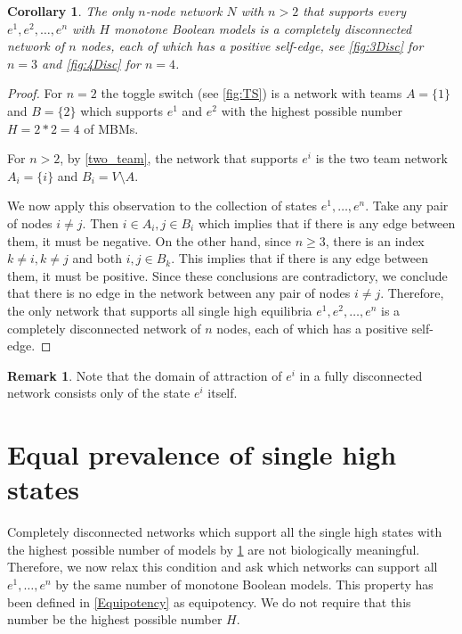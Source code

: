\documentclass[12pt]{amsart}
\newtheorem{cor}[thm]{Corollary}
\theoremstyle{definition}
\newtheorem{rem}[thm]{Remark}
\begin{document}
\begin{cor} \label{cor:disconnected}
    The only $n$-node network $N$ with $n >2$ that supports every $e^1, e^2, \ldots, e^n$ with $H$ monotone Boolean models is a completely disconnected network of $n$ nodes, each of which has a positive self-edge, see \cref{fig:3Disc} for $n=3$ and \cref{fig:4Disc} for $n=4$.
\end{cor}
\begin{proof}
For $n=2$ the toggle switch (see \cref{fig:TS}) is a network with teams $A=\{1\}$ and $B=\{2\}$ which supports $e^1$ and $e^2$
with the highest possible number $H=2*2=4$ of MBMs.

For $n>2$, by \cref{two_team}, the network that supports $e^i$ is the two team network $A_i=\{i\}$ and $B_i=V\setminus A$.

We now apply this observation to the collection of states $e^1, \ldots, e^n$. Take any pair of nodes $i \not = j$. Then $i \in A_i, j \in B_i$ which implies that if there is any edge between them, it must be negative. On the other hand, since $n \geq 3$, there is an index $k \not = i, k\not = j$ and both $i,j \in B_k$. This implies that if there is any edge between them, it must be positive. Since these conclusions are contradictory, we conclude that 
there is no edge in the network between any pair of nodes $i \not = j$.
Therefore, the only network that supports all single high equilibria $e^1, e^2, \ldots, e^n$ is a completely disconnected network of $n$ nodes, each of which has a positive self-edge. 
\end{proof}

\begin{rem}
    Note that the domain of attraction of $e^i$ in a fully disconnected network consists only of the state $e^i$ itself.
\end{rem}

\section{Equal prevalence of single high states} \label{sec:prevalence}
Completely disconnected networks which support all the single high states with the highest possible number of models by \cref{cor:disconnected} are not biologically meaningful. Therefore, we now relax this condition and ask which networks can support all $e^1, \ldots, e^n$ by the same number of monotone Boolean models. This property has been defined in \cref{Equipotency} as equipotency. We do not require that this number be the highest possible number $H$.
\end{document}
